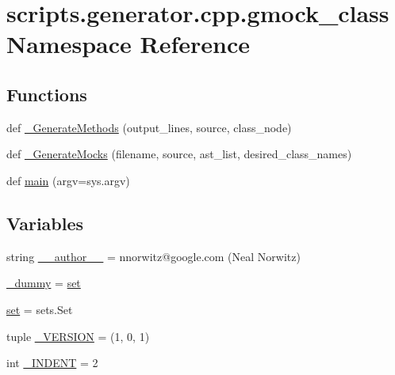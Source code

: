 \hypertarget{namespacescripts_1_1generator_1_1cpp_1_1gmock__class}{}\section{scripts.\+generator.\+cpp.\+gmock\+\_\+class Namespace Reference}
\label{namespacescripts_1_1generator_1_1cpp_1_1gmock__class}
\subsection*{Functions}
\begin{DoxyCompactItemize}
\item 
def \mbox{\hyperlink{namespacescripts_1_1generator_1_1cpp_1_1gmock__class_a340e0ffbe8b474084a4f663beda502c7}{\+\_\+\+Generate\+Methods}} (output\+\_\+lines, source, class\+\_\+node)
\item 
def \mbox{\hyperlink{namespacescripts_1_1generator_1_1cpp_1_1gmock__class_a7d22be543c8d00fa9447423613f5051a}{\+\_\+\+Generate\+Mocks}} (filename, source, ast\+\_\+list, desired\+\_\+class\+\_\+names)
\item 
def \mbox{\hyperlink{namespacescripts_1_1generator_1_1cpp_1_1gmock__class_a402035a2654a8c5df5cfc472fab3387a}{main}} (argv=sys.\+argv)
\end{DoxyCompactItemize}
\subsection*{Variables}
\begin{DoxyCompactItemize}
\item 
string \mbox{\hyperlink{namespacescripts_1_1generator_1_1cpp_1_1gmock__class_ae1b56ce99653dddc0c91337c59f0b135}{\+\_\+\+\_\+author\+\_\+\+\_\+}} = \textquotesingle{}nnorwitz@google.\+com (Neal Norwitz)\textquotesingle{}
\item 
\mbox{\hyperlink{namespacescripts_1_1generator_1_1cpp_1_1gmock__class_a4ba021ade0bbf1ab85eaf7599ceed0fb}{\+\_\+dummy}} = \mbox{\hyperlink{namespacescripts_1_1generator_1_1cpp_1_1gmock__class_a386c2961f37ce94d75917df65b2b9f1d}{set}}
\item 
\mbox{\hyperlink{namespacescripts_1_1generator_1_1cpp_1_1gmock__class_a386c2961f37ce94d75917df65b2b9f1d}{set}} = sets.\+Set
\item 
tuple \mbox{\hyperlink{namespacescripts_1_1generator_1_1cpp_1_1gmock__class_a9d64018872dac32a5565c95821754c65}{\+\_\+\+V\+E\+R\+S\+I\+ON}} = (1, 0, 1)
\item 
int \mbox{\hyperlink{namespacescripts_1_1generator_1_1cpp_1_1gmock__class_a89d748ae591fb1739fc9ddff2d30c3f7}{\+\_\+\+I\+N\+D\+E\+NT}} = 2
\end{DoxyCompactItemize}


